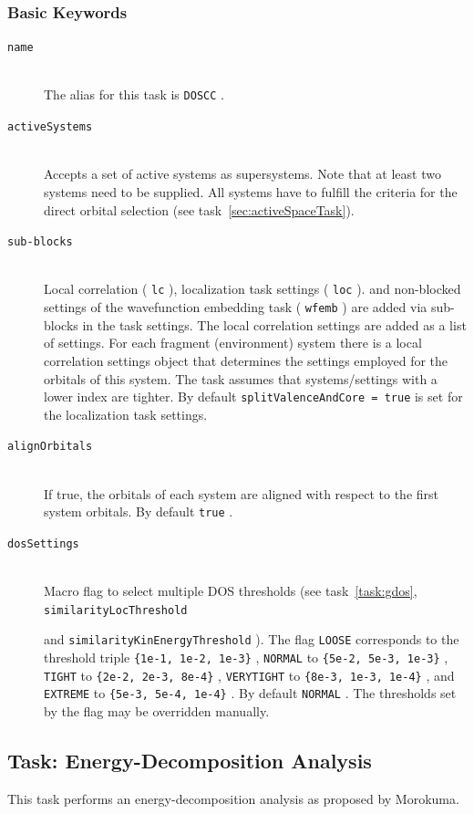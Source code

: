 \documentclass[bibliography=totocnumbered,a4paper,10pt,oneside]{scrbook}
\newcommand{\ttt}[1]{%
  \begingroup\setlength{\fboxsep}{1pt}%
  \colorbox{serenity-green!30}{\texttt{\hspace*{2pt}\vphantom{(g}#1\hspace*{2pt}}}%
  \endgroup
}
\begin{document}
\subsubsection{Basic Keywords}
\begin{description}
\item [\texttt{name}]\hfill \\
The alias for this task is \ttt{DOSCC}.
\item [\texttt{activeSystems}]\hfill \\
Accepts a set of active systems as supersystems. Note that at least two systems need to be supplied.
All systems have to fulfill the criteria for the direct orbital selection (see task~\ref{sec:activeSpaceTask}).
\item [\texttt{sub-blocks}]\hfill \\
Local correlation (\ttt{lc}), localization task settings (\ttt{loc}). and non-blocked settings
of the wavefunction embedding task (\ttt{wfemb}) are added via sub-blocks in the task settings.
The local correlation settings are added as a list of settings. For each fragment (environment) system there is
a local correlation settings object that determines the settings employed for the orbitals of this system. The
task assumes that systems/settings with a lower index are tighter.
By default \ttt{splitValenceAndCore = true} is set for the localization task settings.
\item [\texttt{alignOrbitals}]\hfill \\
If true, the orbitals of each system are aligned with respect to the first system orbitals. By default \ttt{true}.
\item [\texttt{dosSettings}]\hfill \\
Macro flag to select multiple DOS thresholds (see task~\ref{task:gdos}, \ttt{similarityLocThreshold}
and \ttt{similarityKinEnergyThreshold}). The flag \ttt{LOOSE} corresponds to the threshold triple \ttt{\{1e-1, 1e-2, 1e-3\}},
\ttt{NORMAL} to \ttt{\{5e-2, 5e-3, 1e-3\}}, \ttt{TIGHT} to  \ttt{\{2e-2, 2e-3, 8e-4\}}, \ttt{VERYTIGHT} to \ttt{\{8e-3, 1e-3, 1e-4\}},
and \ttt{EXTREME} to \ttt{\{5e-3, 5e-4, 1e-4\}}.
By default \ttt{NORMAL}. The thresholds set by the flag may be overridden manually.
\end{description}

\subsection{Task: Energy-Decomposition Analysis}
This task performs an energy-decomposition analysis as proposed by Morokuma\cite{Morokuma1971}.
\end{document}
